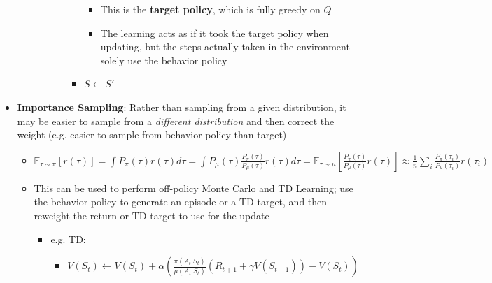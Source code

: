 \documentclass{article}
\providecommand{\tightlist}{%
  \setlength{\itemsep}{\GlobalItemSep}\setlength{\parskip}{\GlobalListParSkip}}
\newlength{\GlobalItemSep}
\newlength{\GlobalListParSkip}
\begin{document}
\begin{multicols}{2}
\begin{itemize}
\begin{itemize}
\begin{itemize}
\begin{itemize}
\begin{itemize}
          \begin{itemize}
          \tightlist
          \item
            This is the \textbf{target policy}, which is fully greedy on
            \(Q\)
          \item
            The learning \textquotesingle acts\textquotesingle{} as if
            it took the target policy when updating, but the steps
            actually taken in the environment solely use the behavior
            policy
          \end{itemize}
        \item
          \(S \leftarrow S'\)
        \end{itemize}
      \end{itemize}
    \end{itemize}
  \end{itemize}
\item
  \textbf{Importance Sampling}: Rather than sampling from a given
  distribution, it may be easier to sample from a \emph{different
  distribution} and then correct the weight (e.g. easier to sample from
  behavior policy than target)

  \begin{itemize}
  \tightlist
  \item
    \(\mathbb{E}_{\tau \sim \pi}[r(\tau)] = \int P_\pi(\tau) r(\tau) d\tau = \int P_\mu (\tau) \frac{P_\pi (\tau)}{P_\mu (\tau)} r(\tau) d\tau = \mathbb{E}_{\tau \sim \mu}[\frac{P_\pi (\tau)}{P_\mu (\tau)} r(\tau)] \approx \frac{1}{n} \sum_i \frac{P_\pi (\tau_i)}{P_\mu (\tau_i)} r(\tau_i)\)
  \item
    This can be used to perform off-policy Monte Carlo and TD Learning;
    use the behavior policy to generate an episode or a TD target, and
    then reweight the return or TD target to use for the update

    \begin{itemize}
    \tightlist
    \item
      e.g. TD:

      \begin{itemize}
      \tightlist
      \item
        \(V(S_t) \leftarrow V(S_t) + \alpha(\frac{\pi(A_t | S_t)}{\mu(A_t | S_t)}(R_{t+1} + \gamma V(S_{t+1})) - V(S_t))\)
      \end{itemize}
    \end{itemize}
  \end{itemize}
\end{itemize}


\end{multicols}
\end{document}
